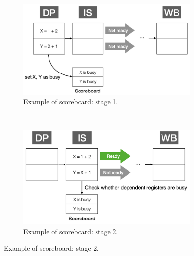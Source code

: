 \begin{figure}[!htp]
    \centering
    \begin{subfigure}{0.4\textwidth}
        \includegraphics[width=\textwidth]{figure/sb1.png}
        \caption{Example of scoreboard: stage 1.}
        \label{fig:sb-1}
    \end{subfigure}
    ~
    \begin{subfigure}{0.4\textwidth}
        \includegraphics[width=\textwidth]{figure/sb2.png}
        \caption{Example of scoreboard: stage 2.}
        \label{fig:sb-2}
    \end{subfigure}
    

\end{figure}
